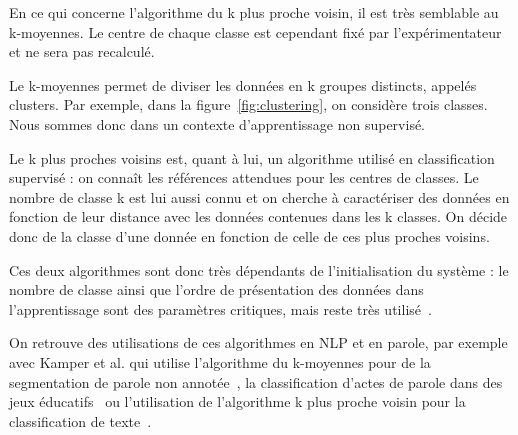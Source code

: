 
En ce qui concerne l'algorithme du k plus proche voisin, il est très semblable au k-moyennes. Le centre de chaque classe est cependant fixé par l'expérimentateur et ne sera pas recalculé.



Le k-moyennes permet de diviser les données en k groupes distincts, appelés clusters. Par exemple, dans la figure~\ref{fig:clustering}, on considère trois classes. Nous sommes donc dans un contexte d'apprentissage non supervisé.

Le k plus proches voisins est, quant à lui, un algorithme utilisé en classification supervisé : on connaît les références attendues pour les centres de classes. Le nombre de classe k est lui aussi connu et on cherche à caractériser des données en fonction de leur distance avec les données contenues dans les k classes. On décide donc de la classe d'une donnée en fonction de celle de ces plus proches voisins.

Ces deux algorithmes sont donc très dépendants de l'initialisation du système : le nombre de classe ainsi que l'ordre de présentation des données dans l'apprentissage sont des paramètres critiques, mais reste très utilisé~\cite{Jain2010}.

On retrouve des utilisations de ces algorithmes en NLP et en parole, par exemple avec Kamper et al. qui utilise l'algorithme du k-moyennes pour de la segmentation de parole non annotée~\cite{Kamper2017}, la classification d'actes de parole dans des jeux éducatifs~\cite{Rus2012} ou l'utilisation de l'algorithme k plus proche voisin pour la classification de texte~\cite{Zhou2015}.


